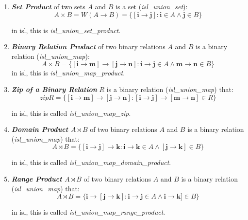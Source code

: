 \begin{enumerate}
  \item \textcolor{vr}{\textbf{\emph{Set Product}}} of two sets $A$ and $B$ is a set (\textcolor{pg}{\emph{isl\_union\_set}}):
  $$A \times B = \mathit{W}(A \rightarrow B) = \{ [\mathbf{i} \rightarrow \mathbf{j}] :
  \mathbf{i} \in A \wedge \mathbf{j} \in B\}$$

  in isl, this is \textcolor{pg}{\emph{isl\_union\_set\_product}}.

  \item \textcolor{vr}{\textbf{\emph{Binary Relation Product}}} of two binary relations $A$ and $B$ is a binary relation (\textcolor{pg}{\emph{isl\_union\_map}}):
  $$A \times B = \{ [\mathbf{i} \rightarrow \mathbf{m}] \rightarrow [\mathbf{j} \rightarrow \mathbf{n} ]:
  \mathbf{i} \rightarrow \mathbf{j} \in A \wedge \mathbf{m} \rightarrow \mathbf{n} \in B \}$$
  in isl, this is \textcolor{pg}{\emph{isl\_union\_map\_product}}.

  \item \textcolor{vr}{\textbf{\emph{Zip of a Binary Relation}}} $R$ is a binary relation (\textcolor{pg}{\emph{isl\_union\_map}}) that:
  $$zip R = \{ [\mathbf{i} \rightarrow \mathbf{m}] \rightarrow [\mathbf{j} \rightarrow \mathbf{n}]:
  [\mathbf{i} \rightarrow \mathbf{j}] \rightarrow [\mathbf{m} \rightarrow \mathbf{n}] \in R\}$$

  in isl, this is called \textcolor{pg}{\emph{isl\_union\_map\_zip}}.

  \item \textcolor{vr}{\textbf{\emph{Domain Product $A \rtimes B$}}} of two binary relations $A$ and $B$ is a binary relation (\textcolor{pg}{\emph{isl\_union\_map}}) that:
  $$ A \rtimes B = \{ [\mathbf{i} \rightarrow \mathbf{j}] \rightarrow \mathbf{k}:
  \mathbf{i} \rightarrow \mathbf{k} \in A \wedge [\mathbf{j} \rightarrow \mathbf{k}] \in B\}$$

  in isl, this is called \textcolor{pg}{\emph{isl\_union\_map\_domain\_product}}.

  \item \textcolor{vr}{\textbf{\emph{Range Product $A \rtimes B$}}} of two binary relations $A$ and $B$ is a binary relation (\textcolor{pg}{\emph{isl\_union\_map}}) that:
  $$ A \rtimes B = \{ \mathbf{i} \rightarrow [\mathbf{j} \rightarrow \mathbf{k}]:
  \mathbf{i} \rightarrow \mathbf{j} \in A \wedge \mathbf{i} \rightarrow \mathbf{k}] \in B\}$$

  in isl, this is called \textcolor{pg}{\emph{isl\_union\_map\_range\_product}}.


\end{enumerate}
